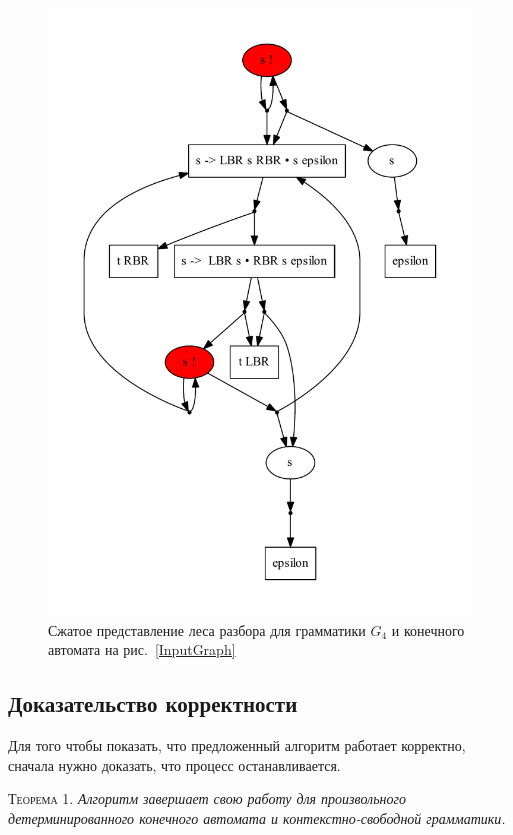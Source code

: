 \begin{figure}
 \centering
 \includegraphics[width=\textwidth]{Ragozina/pics/SppfExample.pdf}
 \caption{Сжатое представление леса разбора для грамматики $G_4$ и конечного автомата на рис.~\ref{InputGraph} }
 \label{ExSppf}
\end{figure}

\subsection{Доказательство корректности}
Для того чтобы показать, что предложенный алгоритм работает корректно, сначала нужно доказать, что процесс останавливается.

\textsc{Теорема 1.} 
\textit{Алгоритм завершает свою работу для произвольного детерминированного конечного автомата и контекстно-свободной грамматики.}

